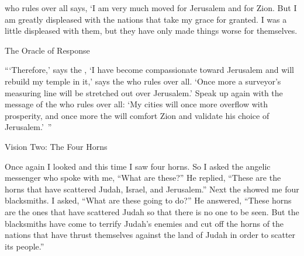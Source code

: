 {{}
who rules over all
says, ‘I am very much
moved for Jerusalem
and for Zion.
But I am
greatly
displeased
with the nations
that take my grace
for granted. I
was a little
displeased
with them,
but
they
have only made things
worse for themselves.
\par }{\SH The Oracle of Response
\par }{\PP {}“‘Therefore,’
says
the {}, ‘I have become compassionate
toward Jerusalem
and will rebuild
my temple
in it,’ says
the {}
who rules over all.
‘Once more a surveyor’s measuring line
will be stretched
out over
Jerusalem.’
Speak up again
with the message
of the {}
who rules over all: ‘My cities
will once more
overflow
with prosperity,
and once more
the {}
will comfort
Zion
and validate
his choice
of Jerusalem.’ ”
\par }{\SH Vision Two: The Four Horns
\par }{\PP {} Once again I looked
and this time I saw
four
horns.
So I asked
the angelic
messenger
who spoke
with me, “What
are these?” He replied,
“These
are the horns
that
have scattered
Judah,
Israel,
and Jerusalem.”
Next
the {}
showed
me four
blacksmiths.
I asked,
“What
are these
going
to do?” He answered,
“These
horns
are the ones that
have scattered
Judah
so that there
is no
one
to be seen. But the blacksmiths
have come
to terrify
Judah’s enemies and cut off the
horns
of the nations
that have thrust themselves against
the land
of Judah
in order to scatter its people.”

\par }
